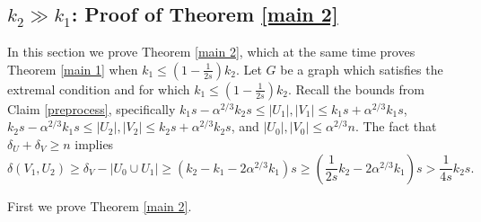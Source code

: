 \documentclass[oneside,12pt]{memoir}
\newtheorem{proposition}[theorem]{Proposition}
\newcommand{\croot}[1]{\left\lceil\sqrt{#1}\right\rceil}
\begin{document}



\subsection{$k_2\gg k_1$: Proof of Theorem \ref{main 2}}

In this section we prove Theorem \ref{main 2}, which at the same time proves Theorem \ref{main 1} when $k_1\leq (1-\frac{1}{2s})k_2$.  Let $G$ be a graph which satisfies the extremal condition and for which $k_1\leq (1-\frac{1}{2s})k_2$.  Recall the bounds from Claim \ref{preprocess}, specifically $k_1s-\alpha^{2/3}k_2s\leq|U_1|,|V_1|\leq k_1s+\alpha^{2/3}k_1s$, $k_2s-\alpha^{2/3}k_1s\leq|U_2|,|V_2|\leq k_2s+\alpha^{2/3}k_2s$, and $|U_0|,|V_0|\leq \alpha^{2/3}n$.  The fact that $\delta_U+\delta_V\geq n$ implies 
\begin{equation}\label{V1toU2:big}
\delta(V_1,U_2)\geq \delta_V-|U_0\cup U_1|\geq (k_2-k_1-2\alpha^{2/3}k_1)s
\geq(\frac{1}{2s} k_2-2\alpha^{2/3}k_1)s>\frac{1}{4s}k_2s.
\end{equation}

First we prove Theorem \ref{main 2}.

% 
\end{document}

